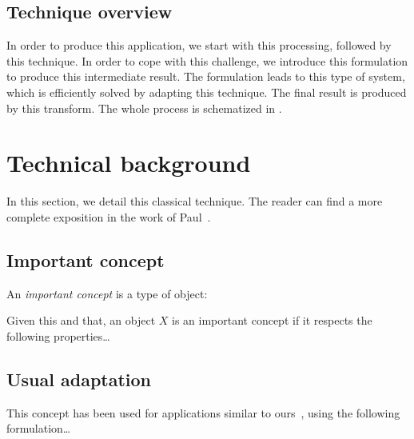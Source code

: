 \subsection{Technique overview}
%
In order to produce this application, we start with this processing, followed by this technique. In order to cope with this challenge, we introduce this formulation to produce this intermediate result. The formulation leads to this type of system, which is efficiently solved by adapting this technique. The final result is produced by this transform. The whole process is schematized in .



\section{Technical background}
%
In this section, we detail this classical technique. The reader can find a more complete exposition in the work of Paul~\cite{Sibgrapi2014}.


\subsection{Important concept}
%
An \emph{important concept} is a type of object:
\begin{definition}
Given this and that, an object $X$ is an important concept if it respects the following properties\ldots{}
\end{definition}


\subsection{Usual adaptation}
%
This concept has been used for applications similar to ours~\cite{Sibgrapi2014}, using the following formulation\ldots{}